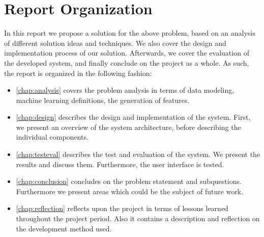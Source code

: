\section{Report Organization}
In this report we propose a solution for the above problem, based on an analysis of different solution ideas and techniques. We also cover the design and implementation process of our solution. Afterwards, we cover the evaluation of the developed system, and finally conclude on the project as a whole. As such, the report is organized in the following fashion:

\begin{itemize}
	\item \cref{chap:analysis} covers the problem analysis in terms of data modeling, machine learning definitions, the generation of features.
  \item \cref{chap:design} describes the design and implementation of the system. First, we present an overview of the system architecture, before describing the individual components.
  \item \cref{chap:testeval} describes the test and evaluation of the system. We present the results and discuss them. Furthermore, the user interface is tested.
  \item \cref{chap:conclusion} concludes on the problem statement and subquestions. Furthermore we present areas which could be the subject of future work.
  \item \cref{chap:reflection} reflects upon the project in terms of lessons learned throughout the project period. Also it contains a description and reflection on the development method used.

\end{itemize}

